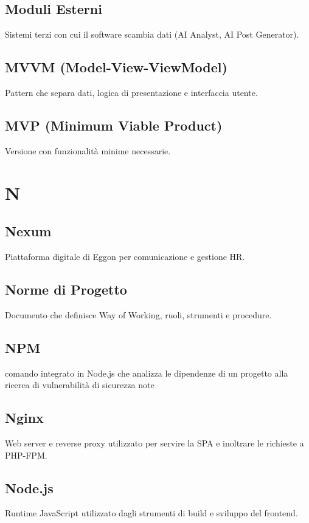 \documentclass[a4paper,12pt]{article}
\begin{document}
\subsection{Moduli Esterni}
Sistemi terzi con cui il software scambia dati (AI Analyst, AI Post Generator).

\subsection{MVVM (Model-View-ViewModel)}
Pattern che separa dati, logica di presentazione e interfaccia utente.

\subsection{MVP (Minimum Viable Product)}
Versione con funzionalità minime necessarie.

\section{N}
\subsection{Nexum}
Piattaforma digitale di Eggon per comunicazione e gestione HR.

\subsection{Norme di Progetto}
Documento che definisce Way of Working, ruoli, strumenti e procedure.

\subsection{NPM}
comando integrato in Node.js che analizza le dipendenze di un progetto alla ricerca di vulnerabilità di sicurezza note

\subsection{Nginx}
Web server e reverse proxy utilizzato per servire la SPA e inoltrare le richieste a PHP-FPM.

\subsection{Node.js}
Runtime JavaScript utilizzato dagli strumenti di build e sviluppo del frontend.
\end{document}
